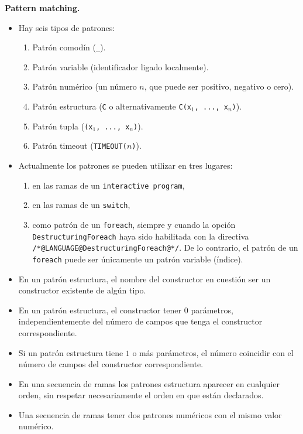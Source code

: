 \documentclass{article}
\begin{document}
{\bf Pattern matching.}
\begin{itemize}
\item Hay seis tipos de patrones:
  \begin{enumerate}
  \item Patr\'on comod\'in (\texttt{\_}).
  \item Patr\'on variable (identificador ligado localmente).
  \item Patr\'on num\'erico (un n\'umero $n$, que puede ser positivo, negativo o cero).
  \item Patr\'on estructura (\texttt{C} o alternativamente \texttt{C(x$_1$, ..., x$_n$)}).
  \item Patr\'on tupla (\texttt{(x$_1$, ..., x$_n$)}).
  \item Patr\'on timeout (\texttt{TIMEOUT($n$)}).
  \end{enumerate}
\item Actualmente los patrones se pueden utilizar en tres lugares:
      \begin{enumerate}
      \item en las ramas de un \texttt{interactive program},
      \item en las ramas de un \texttt{switch},
      \item como patr\'on de un \texttt{foreach},
            siempre y cuando la opci\'on \texttt{DestructuringForeach}
            haya sido habilitada con la directiva \texttt{/*@LANGUAGE@DestructuringForeach@*/}.
            De lo contrario, el patr\'on de un \texttt{foreach}
            puede ser \'unicamente un patr\'on variable (\'indice).
      \end{enumerate}
\item En un patr\'on estructura, el nombre del constructor en cuesti\'on \DEBE ser un constructor existente de
      alg\'un tipo.
\item En un patr\'on estructura, el constructor \PUEDE tener $0$ par\'ametros, independientemente del n\'umero
      de campos que tenga el constructor correspondiente.
\item Si un patr\'on estructura tiene $1$ o m\'as par\'ametros, el n\'umero \DEBE coincidir con el n\'umero
      de campos del constructor correspondiente.
\item En una secuencia de ramas los patrones estructura \PUEDEN aparecer en cualquier orden, sin respetar necesariamente el orden en que est\'an declarados.
\item Una secuencia de ramas \NOPUEDE tener dos patrones num\'ericos con el mismo valor num\'erico.

\end{itemize}
\end{document}
